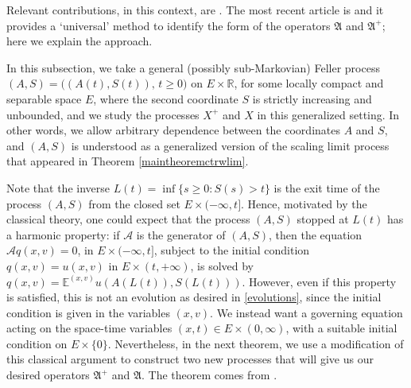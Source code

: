 \documentclass[reqno]{amsart}
\theoremstyle{remark}
\numberwithin{equation}{section} %
\newcommand{\RR}{\mathbb{R}}
\newcommand{\1}{\mathds{1}}
\begin{document}
	Relevant contributions, in this context, are \cite{kolokoltsov2009generalized, hernandez2017, baeumer2017fokker, savtoa, ascione2024, biocic2025}.
	The most recent article is \cite{biocic2025} and it provides a `universal' method to identify the form of the operators $\mathfrak{A}$ and $\mathfrak{A}^+$; here we explain the approach.
	
	In this subsection, we take a general (possibly sub-Markovian) Feller process $(A,S)=\big((A(t),S(t)),\, t\ge0\big)$ on $E\times \RR$, for some locally compact and separable space $E$, where the second coordinate $S$ is strictly increasing and unbounded, and we study the processes $X^+$ and $X$ in this generalized setting. In other words, we allow arbitrary dependence between the coordinates $A$ and $S$, and $(A,S)$ is understood as a generalized version of the scaling limit process that appeared in Theorem \ref{maintheoremctrwlim}.
	
	Note that the inverse $L(t)=\inf\{s\ge0:S(s)>t\}$ is the exit time of the process $(A,S)$ from the closed set $E \times (-\infty, t]$. Hence, motivated by the classical theory, one could expect that the process $(A,S)$ stopped at $L(t)$ has a harmonic property: if $\mathcal{A}$ is the generator of $(A,S)$, then the equation $\mathcal{A}q(x,v)=0$, in $E \times (-\infty, t]$, subject to the initial condition $q(x,v)=u(x,v)$ in $E \times (t, +\infty)$, is solved by $q(x,v) =\mathds{E}^{(x,v)}u(A({L(t)}), S({L(t)}))$. However, even if this property is satisfied, this is not an evolution as desired in \eqref{evolutions}, since the initial condition is given in the variables $(x,v)$. We instead want a governing equation acting on the space-time variables $(x,t)\in E\times (0,\infty)$, with a suitable initial condition on $E\times \{0\}$. Nevertheless, in the next theorem, we use a modification of this classical argument to construct two new processes that will give us our desired operators $\mathfrak{A}^+$ and $\mathfrak{A}$. The theorem comes from \cite[Theorem 2.1]{biocic2025}.
	
	
	
\end{document}
